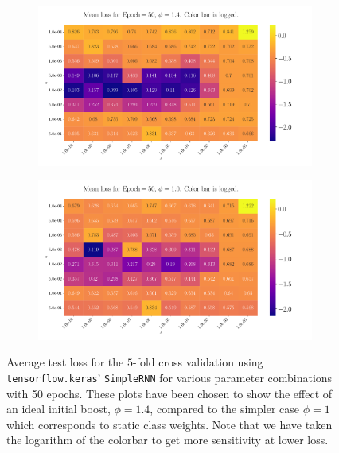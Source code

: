 \documentclass[%
reprint,
amsmath,amssymb,
aps,
]{revtex4-2}
\begin{document}
\begin{figure}[ht!]
	\begin{subfigure}{0.499\textwidth}
		\includegraphics[width=\textwidth]{Figures/2D_Plot_Loss_Epoch50_Boost1.4.pdf}
	\end{subfigure}
	\newline
	\begin{subfigure}{0.499\textwidth}
		\includegraphics[width=\textwidth]{Figures/2D_Plot_Loss_Epoch50_Boost1.0.pdf}
	\end{subfigure}
	\caption{Average test loss for the $5$-fold cross validation using \texttt{tensorflow.keras}' \texttt{SimpleRNN} for various parameter combinations with 50 epochs. These plots have been chosen to show the effect of an ideal initial boost, $\phi=1.4$, compared to the simpler case $\phi=1$ which corresponds to static class weights. Note that we have taken the logarithm of the colorbar to get more sensitivity at lower loss.}
	\label{fig:PhiShowcase}	
\end{figure}
\end{document}
